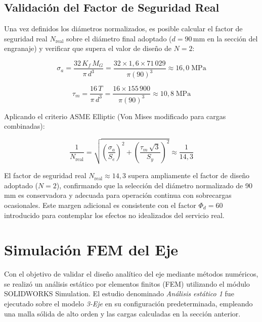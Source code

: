 \documentclass[conference]{IEEEtran}
\begin{document}
\subsection{Validación del Factor de Seguridad Real}

Una vez definidos los diámetros normalizados, es posible calcular el factor de seguridad
real $N_{\text{real}}$ sobre el diámetro final adoptado ($d = 90$\,mm en la sección del
engranaje) y verificar que supera el valor de diseño de $N = 2$:

\begin{equation}
\sigma_a = \frac{32\,K_f\,M_G}{\pi\,d^3}
         = \frac{32 \times 1{,}6 \times 71\,029}{\pi (90)^3}
         \approx 16{,}0\;\mathrm{MPa}
\end{equation}

\begin{equation}
\tau_m = \frac{16\,T}{\pi\,d^3}
       = \frac{16 \times 155\,900}{\pi (90)^3}
       \approx 10{,}8\;\mathrm{MPa}
\end{equation}

Aplicando el criterio ASME Elliptic (Von Mises modificado para cargas combinadas):

\begin{equation}
\frac{1}{N_{\text{real}}} =
  \sqrt{\left(\frac{\sigma_a}{S_e}\right)^2
       +\left(\frac{\tau_m\,\sqrt{3}}{S_y}\right)^2}
\approx \frac{1}{14{,}3}
\end{equation}

El factor de seguridad real $N_{\text{real}} \approx 14{,}3$ supera ampliamente el factor
de diseño adoptado ($N = 2$), confirmando que la selección del diámetro normalizado de
90\,mm es conservadora y adecuada para operación continua con sobrecargas ocasionales. Este
margen adicional es consistente con el factor $\Phi_d = 60$ introducido para contemplar
los efectos no idealizados del servicio real.

\section{Simulación FEM del Eje}

Con el objetivo de validar el diseño analítico del eje mediante métodos
numéricos, se realizó un análisis estático por elementos finitos (FEM)
utilizando el módulo SOLIDWORKS Simulation. El estudio denominado
\textit{Análisis estático 1} fue ejecutado sobre el modelo \textit{3-Eje}
en su configuración predeterminada, empleando una malla sólida de alto
orden y las cargas calculadas en la sección anterior.
\end{document}
